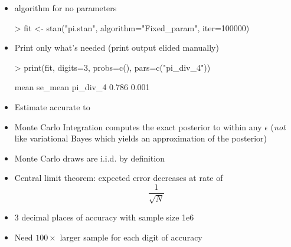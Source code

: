 \documentclass[10pt]{report}
\begin{document}
\begin{itemize}
\item {} algorithm for no parameters
\begin{stancode}
> fit <- stan("pi.stan", algorithm="Fixed_param",
              iter=100000)
\end{stancode}
\item Print only what's needed (print output elided manually)
\begin{stancode}
> print(fit, digits=3, probs=c(), pars=c("pi_div_4"))

          mean se_mean
pi_div_4 0.786   0.001
\end{stancode}
\item Estimate accurate to 
\end{itemize}


%
\begin{itemize}
\item Monte Carlo Integration computes the exact posterior to within any $\epsilon$
(\emph{not} like variational Bayes which yields an approximation of the posterior)
\item Monte Carlo draws are i.i.d. by definition
\item Central limit theorem: expected error decreases at rate of
{\Large
\[
\frac{1}{\sqrt{N}}
\]
}
\item 3 decimal places of accuracy with
sample size 1e6
\item Need $100 \times$ larger sample for each digit of accuracy
\end{itemize}
\end{document}
